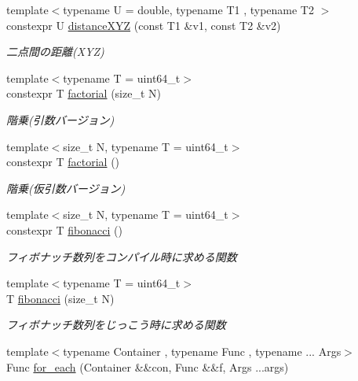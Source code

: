 \begin{DoxyCompactItemize}
{\footnotesize template$<$typename U  = double, typename T1 , typename T2 $>$ }\\constexpr U \mbox{\hyperlink{namespacesaki_aca24fd78c511e7ccd8f14a9c04eff7e9}{distance\+X\+YZ}} (const T1 \&v1, const T2 \&v2)
\begin{DoxyCompactList}\small\item\em 二点間の距離(\+X\+Y\+Z) \end{DoxyCompactList}\item 
{\footnotesize template$<$typename T  = uint64\+\_\+t$>$ }\\constexpr T \mbox{\hyperlink{namespacesaki_a224c4843b72acf995e13809a5caaafd8}{factorial}} (size\+\_\+t N)
\begin{DoxyCompactList}\small\item\em 階乗(引数バージョン) \end{DoxyCompactList}\item 
{\footnotesize template$<$size\+\_\+t N, typename T  = uint64\+\_\+t$>$ }\\constexpr T \mbox{\hyperlink{namespacesaki_a9dead910b791cee99cf82d1bd2a5d90c}{factorial}} ()
\begin{DoxyCompactList}\small\item\em 階乗(仮引数バージョン) \end{DoxyCompactList}\item 
{\footnotesize template$<$size\+\_\+t N, typename T  = uint64\+\_\+t$>$ }\\constexpr T \mbox{\hyperlink{namespacesaki_a7bbb434ee3c6d77eeb32b85bb9e316f0}{fibonacci}} ()
\begin{DoxyCompactList}\small\item\em フィボナッチ数列をコンパイル時に求める関数 \end{DoxyCompactList}\item 
{\footnotesize template$<$typename T  = uint64\+\_\+t$>$ }\\T \mbox{\hyperlink{namespacesaki_a7cf047c5fe0107c5cb1584e4d588046e}{fibonacci}} (size\+\_\+t N)
\begin{DoxyCompactList}\small\item\em フィボナッチ数列をじっこう時に求める関数 \end{DoxyCompactList}\item 
{\footnotesize template$<$typename Container , typename Func , typename ... Args$>$ }\\Func \mbox{\hyperlink{namespacesaki_a0b9cd605250f265e3e827406d8f3232d}{for\+\_\+each}} (Container \&\&con, Func \&\&f, Args ...args)

\end{DoxyCompactItemize}
